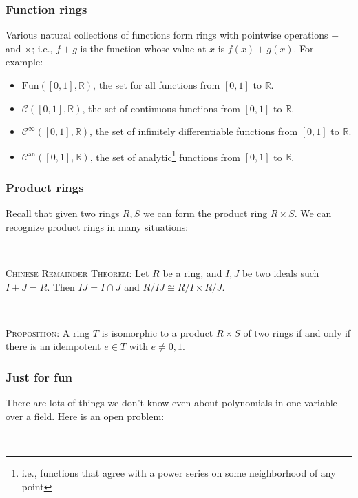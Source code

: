 \documentclass[12pt]{amsart}
\newcommand{\R}{\mathbb{R}}
\newcommand{\cC}{\mathcal{C}}
\newcommand{\0}{$\phantom{.}$}
\newcommand{\1}{\mathbbm{1}}
\begin{document}
\newpage

\subsubsection*{Function rings} Various natural collections of functions form rings with pointwise operations $+$ and $\times$; i.e., $f+g$ is the function whose value at $x$ is $f(x) + g(x)$. For example:
\begin{itemize}
\item $\mathrm{Fun}([0,1],\R)$, the set for all functions from $[0,1]$ to $\R$.
\item $\cC([0,1],\R)$, the set of continuous functions from $[0,1]$ to $\R$.
\item $\cC^{\infty}([0,1],\R)$, the set of infinitely differentiable functions from $[0,1]$ to $\R$.
\item $\cC^{\mathrm{an}}([0,1],\R)$, the set of analytic\footnote{ i.e., functions that agree with a power series on some neighborhood of any point} functions from $[0,1]$ to $\R$.
 \end{itemize}





\subsubsection*{Product rings} Recall that given two rings $R,S$ we can form the product ring $R\times S$. We can recognize product rings in many situations: 

\

\noindent \textsc{Chinese Remainder Theorem:} Let $R$ be a ring, and $I,J$ be two ideals such $I+J=R$. Then $IJ=I\cap J$ and $R/IJ \cong R/I \times R/J$. 

\

\noindent \textsc{Proposition:} A ring $T$ is isomorphic to a product $R\times S$ of two rings if and only if there is an idempotent $e\in T$ with $e\neq 0,1$.

\vfill

\noindent \hrulefill



\subsubsection*{Just for fun} There are lots of things we don't know even about polynomials in one variable over a field. Here is an open problem:

\
\end{document}
